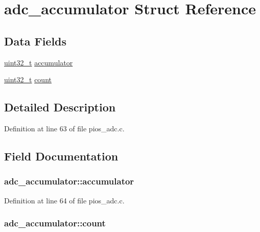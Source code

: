 \hypertarget{structadc__accumulator}{\section{adc\-\_\-accumulator Struct Reference}
\label{structadc__accumulator}
}
\subsection*{Data Fields}
\begin{DoxyCompactItemize}
\item 
\hyperlink{stdint_8h_a435d1572bf3f880d55459d9805097f62}{uint32\-\_\-t} \hyperlink{structadc__accumulator_a32c3fbd5f658b3fb0620fe5843f4f940}{accumulator}
\item 
\hyperlink{stdint_8h_a435d1572bf3f880d55459d9805097f62}{uint32\-\_\-t} \hyperlink{structadc__accumulator_a97541dd757c2f41bf9ce486d882b3cff}{count}
\end{DoxyCompactItemize}


\subsection{Detailed Description}


Definition at line 63 of file pios\-\_\-adc.\-c.



\subsection{Field Documentation}
\hypertarget{structadc__accumulator_a32c3fbd5f658b3fb0620fe5843f4f940}{
\subsubsection[{accumulator}]{ adc\-\_\-accumulator\-::accumulator}}\label{structadc__accumulator_a32c3fbd5f658b3fb0620fe5843f4f940}


Definition at line 64 of file pios\-\_\-adc.\-c.

\hypertarget{structadc__accumulator_a97541dd757c2f41bf9ce486d882b3cff}{
\subsubsection[{count}]{ adc\-\_\-accumulator\-::count}}\label{structadc__accumulator_a97541dd757c2f41bf9ce486d882b3cff}


